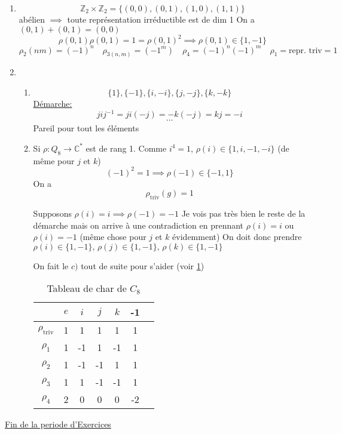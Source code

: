 \begin{enumerate}
	\item \[ \mathds{Z}_2 \times  \mathds{Z}_2 = \{ 	(0,0), (0,1), (1,0), (1,1) \}  \]
		abélien $\implies$ toute représentation irréductible est de dim 1
		On a $(0,1) + (0,1) = (0,0)$
		\[ \rho(0,1)\rho(0,1) =1 = \rho(0,1)^2 \implies \rho(0,1) \in \{ 1,-1 \}  \]
		\[ \rho_2 (nm) = (-1)^n \quad \rho_{3(n,m)} = (-1^m) \quad \rho_4 = (-1)^n (-1)^m \quad \rho_1 = \text{repr. triv} = 1 \]
	\item
		\begin{enumerate}
			\item \[ \{ 1 \}, \{ -1 \} , \{ 	i,-i \}, \{ j,-j \}, \{ k,-k \}   \]
			\underline{Démarche:}
			\[ j i j ^{-1} = j i (-j) = -k(-j) = kj = -i \]
			\[ \dotsb \]
			Pareil pour tout les éléments
		\item Si $\rho: Q_8 \to \mathds{C}^{*}$ est de rang 1. Comme $i^{4}= 1$, $\rho(i) \in \{ 1, i, -1, -i \} $ (de même pour $j$ et $k$)
		\[ (-1)^2 =1 \implies \rho(-1) \in \{ -1, 1 \}  \]
		On a \[ \rho_{\text{triv}}(g) =1  \]

		Supposons $\rho(i) = i \implies \rho(-1) = -1$
		Je vois pas très bien le reste de la démarche mais on arrive à une contradiction  en prennant $\rho(i)= i$ ou $\rho (i) = -1$
		(même chose pour $j$ et $k$ évidemment)
		On doit donc prendre $\rho(i) \in \{ 1,-1 \},\, \rho(j) \in \{ 1,-1 \},\, \rho(k) \in \{ 1,-1 \} $

		On fait le $c)$ tout de suite pour s'aider (voir \ref{tab:carc8})

		\begin{table}[]
			\centering
			\label{tab:carc8}
		
			\begin{tabular}{c|c|c|c|c|c|c}
				& $e$ & $i$ & $j$ & $k$ & -1\\ \hline
				$\rho_{\text{triv}}$ & 1 & 1 & 1 & 1 & 1\\\hline
				$\rho_1$ & 1 & -1 & 1 &-1 & 1\\\hline
				$\rho_2$ & 1 & -1 & -1 & 1 & 1 \\\hline
				$\rho_3$ & 1 & 1 & -1 & -1 & 1 \\\hline
				$\rho_4$ & 2 & 0 & 0 & 0 & -2 
			\end{tabular}
			\caption{Tableau de char de $C_8$} 
		\end{table}
		\end{enumerate}
\end{enumerate}


\underline{Fin de la periode d'Exercices} 


